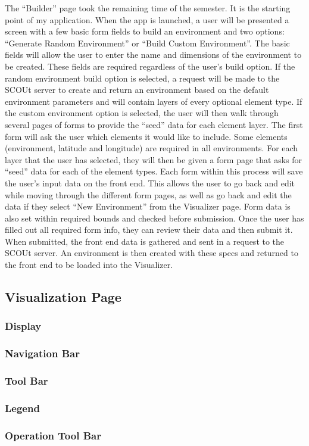 The “Builder” page took the remaining time of the semester.
It is the starting point of my application.
When the app is launched, a user will be presented a screen with a few basic form fields to build an environment and two options: “Generate Random Environment” or “Build Custom Environment”.
The basic fields will allow the user to enter the name and dimensions of the environment to be created.
These fields are required regardless of the user’s build option.
If the random environment build option is selected, a request will be made to the SCOUt server to create and return an environment based on the default environment parameters and will contain layers of every optional element type.
If the custom environment option is selected, the user will then walk through several pages of forms to provide the “seed” data for each element layer.
The first form will ask the user which elements it would like to include.
Some elements (environment, latitude and longitude) are required in all environments.
For each layer that the user has selected, they will then be given a form page that asks for “seed” data for each of the element types.
Each form within this process will save the user’s input data on the front end.
This allows the user to go back and edit while moving through the different form pages, as well as go back and edit the data if they select “New Environment” from the Visualizer page.
Form data is also set within required bounds and checked before submission.
Once the user has filled out all required form info, they can review their data and then submit it.
When submitted, the front end data is gathered and sent in a request to the SCOUt server.
An environment is then created with these specs and returned to the front end to be loaded into the Visualizer.


\subsection{Visualization Page}


\subsubsection{Display}

\subsubsection{Navigation Bar}

\subsubsection{Tool Bar}

\subsubsection{Legend}

\subsubsection{Operation Tool Bar}
